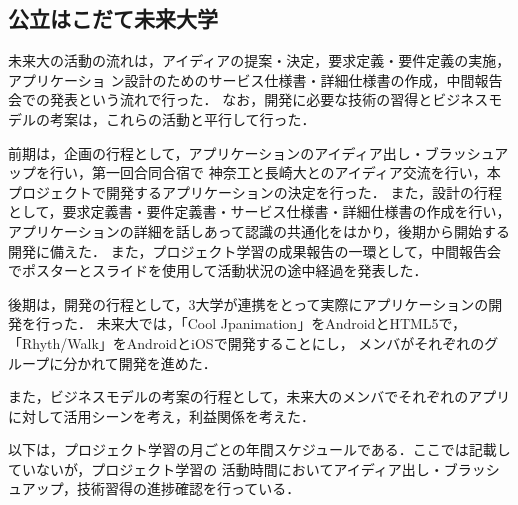 \subsection{公立はこだて未来大学}

\par
未来大の活動の流れは，アイディアの提案・決定，要求定義・要件定義の実施，アプリケーショ
ン設計のためのサービス仕様書・詳細仕様書の作成，中間報告会での発表という流れで行った．
なお，開発に必要な技術の習得とビジネスモデルの考案は，これらの活動と平行して行った．

\par
前期は，企画の行程として，アプリケーションのアイディア出し・ブラッシュアップを行い，第一回合同合宿で
神奈工と長崎大とのアイディア交流を行い，本プロジェクトで開発するアプリケーションの決定を行った．
また，設計の行程として，要求定義書・要件定義書・サービス仕様書・詳細仕様書の作成を行い，
アプリケーションの詳細を話しあって認識の共通化をはかり，後期から開始する開発に備えた．
また，プロジェクト学習の成果報告の一環として，中間報告会でポスターとスライドを使用して活動状況の途中経過を発表した．

\par
後期は，開発の行程として，3大学が連携をとって実際にアプリケーションの開発を行った．
未来大では，「Cool Jpanimation」をAndroidとHTML5で，「Rhyth/Walk」をAndroidとiOSで開発することにし，
メンバがそれぞれのグループに分かれて開発を進めた．

また，ビジネスモデルの考案の行程として，未来大のメンバでそれぞれのアプリに対して活用シーンを考え，利益関係を考えた．

\par
以下は，プロジェクト学習の月ごとの年間スケジュールである．ここでは記載していないが，プロジェクト学習の
活動時間においてアイディア出し・ブラッシュアップ，技術習得の進捗確認を行っている．
\par

